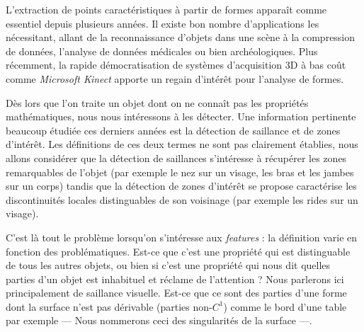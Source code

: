 L'extraction de points caractéristiques à partir de formes apparaît comme
essentiel depuis plusieurs années. Il existe bon nombre d'applications les
nécessitant, allant de la reconnaissance d'objets dans une scène à la
compression de données, l'analyse de données médicales ou bien archéologiques.
Plus récemment, la rapide démocratisation de systèmes d'acquisition 3D à bas
coût comme \emph{Microsoft Kinect} apporte un regain d'intérêt pour l'analyse de
formes.


Dès lors que l'on traite un objet dont on ne connaît pas les propriétés
mathématiques, nous nous intéressons à les détecter. Une information pertinente
beaucoup étudiée ces derniers années est la détection de saillance et de zones
d'intérêt. Les définitions de ces deux termes ne sont pas clairement établies,
nous allons considérer que la détection de saillances s'intéresse à récupérer
les zones remarquables de l'objet (par exemple le nez sur un visage, les bras et
les jambes sur un corps) tandis que la détection de zones d’intérêt se propose
caractérise les discontinuités locales distinguables de son voisinage (par
exemple les rides sur un visage).

C'est là tout le problème lorsqu'on s'intéresse aux \emph{features} : la
définition varie en fonction des problématiques. Est-ce que c'est une propriété
qui est distinguable de tous les autres objets, ou bien si c'est une propriété
qui nous dit quelles parties d'un objet est inhabituel et réclame de l'attention ?
Nous parlerons ici principalement de saillance visuelle. Est-ce que ce sont des
parties d'une forme dont la surface n'est pas dérivable (parties non-$C^1$)
comme le bord d'une table par exemple --- Nous nommerons ceci des singularités
de la surface ---.




